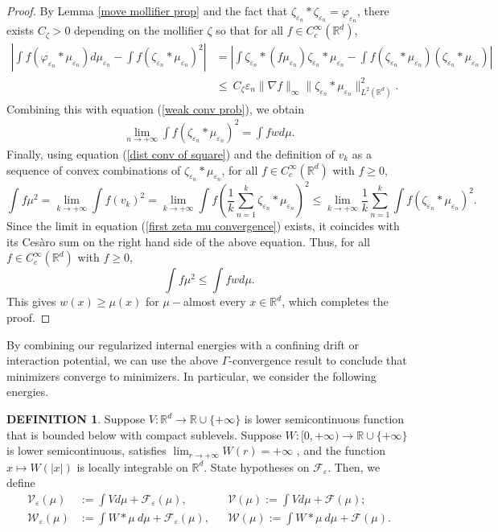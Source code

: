 \documentclass[11pt,leqno]{amsart}
\theoremstyle{definition}
\newtheorem{defi}[thm]{DEFINITION}
\newcommand{\kcomment}[1]{{\color{Aquamarine}#1}} %
\newcommand{\R}{{\mathord{\mathbb R}}}
\newcommand{\Rd}{{\mathord{\mathbb R}^d}}
\newcommand{\grad}{\nabla}
\def\epsilon{\varepsilon}
\def\e{\varepsilon}
\begin{document}
\begin{proof}
By Lemma \ref{move mollifier prop} and the fact that $\zeta_{\e_n} *\zeta_{\e_n} = \varphi_{\e_n}$, there exists $C_\zeta >0$ depending on the mollifier $\zeta$ so that for all $f \in C^\infty_c(\Rd)$,
\begin{align} \left|\int f (\varphi_{\e_n} * \mu_{\e_n}) d \mu_{\e_n}  - \int f (\zeta_{\e_n} * \mu_{\e_n})^2 \right| &= \left|\int \zeta_{\e_n} *(f \mu_{\e_n}) \zeta_{\e_n} *\mu_{\e_n} - \int f  (\zeta_{\e_n} * \mu_{\e_n})( \zeta_{\e_n} * \mu_{\e_n}) \right| \\
&\leq \  C_\zeta \epsilon_n \|\grad f \|_\infty  \|\zeta_{\e_n} * \mu_{\e_n} \|_{L^2(\Rd)}^2 .  
\end{align}
Combining this with equation (\ref{weak conv prob}), we obtain
\begin{align} \lim_{n \to +\infty} \int f (\zeta_{\e_n} *\mu_{\e_n})^2 = \int f w d \mu . \label{first zeta mu convergence}
\end{align}
Finally, using equation (\ref{dist conv of square}) and the definition of $v_k$ as a sequence of convex combinations of $\zeta_{\e_n} *\mu_{\e_n}$, for all $f \in C^\infty_c(\Rd)$ with $f \geq 0$,
\[ \int f \mu^2 = \lim_{k \to +\infty} \int f(v_k)^2  = \lim_{k \to +\infty} \int f \left( \frac{1}{k}\sum_{n=1}^k \zeta_{\e_n}*\mu_{\e_n} \right)^2 \leq  \lim_{k \to +\infty} \frac{1}{k} \sum_{n=1}^k  \int f \left( \zeta_{\e_n}*\mu_{\e_n} \right)^2 . \]
Since the limit in equation (\ref{first zeta mu convergence}) exists, it coincides with its Ces\`aro sum on the right hand side of the above equation. Thus, for all $f \in C^\infty_c(\Rd)$ with $f \geq 0$,
\[ \int f \mu^2 \leq \int f w d \mu . \]
This gives $w(x) \geq \mu(x)$ for $\mu-$almost every $x \in \Rd$, which completes the proof.
\end{proof}

By combining our regularized internal energies with a confining drift or interaction potential, we can use the above $\Gamma$-convergence result to conclude that minimizers converge to minimizers. In particular, we consider the following energies.
\begin{defi} \label{confined energies}
Suppose $V: \Rd \to \mathbb{R} \cup \{ +\infty \}$ is lower semicontinuous function that is bounded below with compact sublevels. Suppose $W: [0, +\infty) \to \R \cup \{+\infty\}$ is lower semicontinuous, satisfies $\lim_{r \to +\infty} W(r) = +\infty$ , and the function $x \mapsto W(|x|)$ is locally integrable on $\Rd$. \kcomment{State hypotheses on $\mathcal{F}_\e$.} Then, we define
\begin{align*} \mathcal{V}_\e(\mu) &:=  \int V d \mu  + \mathcal{F}_\e(\mu)  ,  && \mathcal{V}(\mu) :=  \int V d \mu  + \mathcal{F}(\mu)  ; \\
\mathcal{W}_\e(\mu) &:= \int W*\mu \  d \mu + \mathcal{F}_\e(\mu)  , &&\mathcal{W}(\mu) := \int W*\mu \  d \mu  + \mathcal{F}(\mu)  .
\end{align*}
\end{defi}
\end{document}
